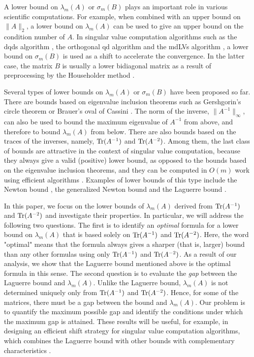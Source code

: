 \documentclass{amsart}
\begin{document}
A lower bound on $\lambda_m(A)$ or $\sigma_m(B) $ plays an important role in various scientific computations. For example, when combined with an upper bound on $\|A\|_2$, a lower bound on $\lambda_m(A)$ can be used to give an upper bound on the condition number of $A$. In singular value computation algorithms such as the dqds algorithm \cite{Fernando94}, the orthogonal qd algorithm \cite {Matt97} and the mdLVs algorithm \cite{Iwasaki06}, a lower bound on $\sigma_m(B)$ is used as a shift to accelerate the convergence. In the latter case, the matrix $B$ is usually a lower bidiagonal matrix as a result of preprocessing by the Householder method \cite{Golub12}.

Several types of lower bounds on $\lambda_m(A)$ or $\sigma_m(B)$ have been proposed so far. There are bounds based on eigenvalue inclusion theorems such as Gershgorin's circle theorem \cite{Johnson89} or Brauer's oval of Cassini \cite{Johnson98}. The norm of the inverse, $\|A^{-1}\|_{\infty}$, can also be used to bound the maximum eigenvalue of $A^{-1}$ from above, and therefore to bound $\lambda_m(A)$ from below. There are also bounds based on the traces of the inverses, namely, ${\rm Tr}(A^{-1})$ and ${\rm Tr}(A^{-2})$. Among them, the last class of bounds are attractive in the context of singular value computation, because they always give a valid (positive) lower bound, as opposed to the bounds based on the eigenvalue inclusion theorems, and they can be computed in $O(m)$ work using efficient algorithms \cite{Kimura11, Yamashita12, Yamashita15}. Examples of lower bounds of this type include the Newton bound \cite {Matt97}, the generalized Newton bound \cite{ Kimura11,Aishima10} and the Laguerre bound \cite{Matt97}.

In this paper, we focus on the lower bounds of $\lambda_m(A)$ derived from ${\rm Tr}(A^{-1})$ and ${\rm Tr}(A^{-2})$ and investigate their properties. In particular, we will address the following two questions. The first is to identify an {\it optimal} formula for a lower bound on $\lambda_m(A)$ that is based solely on ${\rm Tr}(A^{-1})$ and ${\rm Tr}(A^{-2})$. Here, the word "optimal" means that the formula always gives a sharper (that is, larger) bound than any other formulas using only ${\rm Tr}(A^{-1})$ and ${\rm Tr}(A^{-2})$. As a result of our analysis, we show that the Laguerre bound mentioned above is the optimal formula in this sense. The second question is to evaluate the {\it gap} between the Laguerre bound and $\lambda_m(A)$. Unlike the Laguerre bound, $\lambda_m(A)$ is not determined uniquely only from ${\rm Tr}(A^{-1})$ and ${\rm Tr}(A^{-2})$. Hence, for some of the matrices, there must be a gap between the bound and $\lambda_m(A)$. Our problem is to quantify the maximum possible gap and identify the conditions under which the maximum gap is attained. These results will be useful, for example, in designing an efficient shift strategy for singular value computation algorithms, which combines the Laguerre bound with other bounds with complementary characteristics \cite{Yamashita13}.
\end{document}
